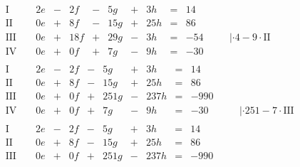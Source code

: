 \begin{exercise}
\begin{minipage}[t]{0.49\linewidth}
\begin{align*}
\begin{array}{r|rrrrrrrrrrrl}
        \end{array}
        \\[1ex]&
        \begin{array}{r|rrrrrrrrrrrl}
          \text{I}{\,} & {\,} & \num{2}e & - &  \num{2}f & - &  \num{5}g & + &  \num{3}h & = &  \num{14} & {\quad} &                                     \\
         \text{II}{\,} & {\,} & \num{0}e & + &  \num{8}f & - & \num{15}g & + & \num{25}h & = &  \num{86} & {\quad} &                                     \\
        \text{III}{\,} & {\,} & \num{0}e & + & \num{18}f & + & \num{29}g & - &  \num{3}h & = & -\num{54} & {\quad} & |\cdot\num{4}-\num{9}\cdot\text{II} \\
         \text{IV}{\,} & {\,} & \num{0}e & + &  \num{0}f & + &  \num{7}g & - &  \num{9}h & = & -\num{30} & {\quad} &
        \end{array}
        \\[1ex]&
        \begin{array}{r|rrrrrrrrrrrl}
          \text{I}{\,} & {\,} & \num{2}e & - & \num{2}f & - &   \num{5}g & + &   \num{3}h & = &   \num{14} & {\quad} &                                        \\
         \text{II}{\,} & {\,} & \num{0}e & + & \num{8}f & - &  \num{15}g & + &  \num{25}h & = &   \num{86} & {\quad} &                                        \\
        \text{III}{\,} & {\,} & \num{0}e & + & \num{0}f & + & \num{251}g & - & \num{237}h & = & -\num{990} & {\quad} &                                        \\
         \text{IV}{\,} & {\,} & \num{0}e & + & \num{0}f & + &   \num{7}g & - &   \num{9}h & = &  -\num{30} & {\quad} & |\cdot\num{251}-\num{7}\cdot\text{III}
        \end{array}
        \\[1ex]&
        \begin{array}{r|rrrrrrrrrrrl}
          \text{I}{\,} & {\,} & \num{2}e & - & \num{2}f & - &   \num{5}g & + &   \num{3}h & = &   \num{14} & {\quad} &                           \\
         \text{II}{\,} & {\,} & \num{0}e & + & \num{8}f & - &  \num{15}g & + &  \num{25}h & = &   \num{86} & {\quad} &                           \\
        \text{III}{\,} & {\,} & \num{0}e & + & \num{0}f & + & \num{251}g & - & \num{237}h & = & -\num{990} & {\quad} &                           \\

\end{array}
\end{align*}
\end{minipage}
\end{exercise}
